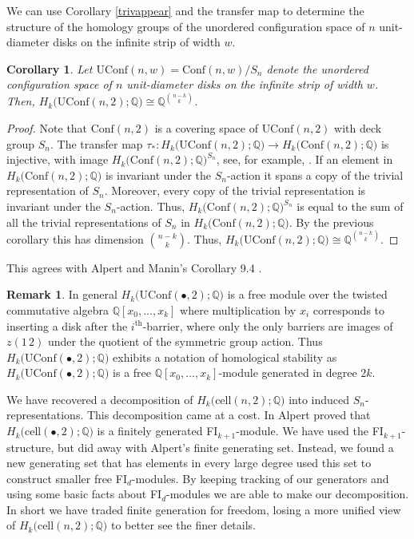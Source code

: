\documentclass[12py]{amsart}%
\newtheorem{cor}[thm]{Corollary}
\theoremstyle{definition}\newtheorem{definition}[thm]{Definition}
\theoremstyle{definition}
\newtheorem{remark}[thm]{Remark}
\newcommand{\Q}{\ensuremath{\mathbb{Q}}}
\begin{document}
We can use Corollary \ref{trivappear} and the transfer map to determine the structure of the homology groups of the unordered configuration space of $n$ unit-diameter disks on the infinite strip of width $w$.

\begin{cor}
Let $\text{UConf}(n,w)=\text{Conf}(n,w)/S_{n}$ denote the unordered configuration space of $n$ unit-diameter disks on the infinite strip of width $w$. Then, $H_{k}\big(\text{UConf}(n,2);\Q\big)\cong\Q^{\binom{n-k}{k}}$.
\end{cor}

\begin{proof}
Note that $\text{Conf}(n,2)$ is a covering space of $\text{UConf}(n,2)$ with deck group $S_{n}$. The transfer map $\tau_{*}:H_{k}\big(\text{UConf}(n,2);\Q\big)\to H_{k}\big(\text{Conf}(n,2);\Q\big)$ is injective, with image $H_{k}\big(\text{Conf}(n,2);\Q\big)^{S_{n}}$, see, for example, \cite[Proposition 3G.1]{hatcher2005algebraic}. If an element in $H_{k}\big(\text{Conf}(n,2);\Q\big)$ is invariant under the $S_{n}$-action it spans a copy of the trivial representation of ${S_{n}}$. Moreover, every copy of the trivial representation is invariant under the $S_{n}$-action. Thus, $H_{k}\big(\text{Conf}(n,2);\Q\big)^{S_{n}}$ is equal to the sum of all the trivial representations of $S_{n}$ in $H_{k}\big(\text{Conf}(n,2);\Q\big)$. By the previous corollary this has dimension $\binom{n-k}{k}$. Thus, $H_{k}\big(\text{UConf}(n,2);\Q\big)\cong\Q^{\binom{n-k}{k}}$.
\end{proof}

This agrees with Alpert and Manin's Corollary 9.4 \cite[Corollary 9.4]{alpert2021configuration1}. 

\begin{remark}
In general $H_{k}\big(\text{UConf}(\bullet, 2);\Q\big)$ is a free module over the twisted commutative algebra $\Q[x_{0}, \dots, x_{k}]$ where multiplication by $x_{i}$ corresponds to inserting a disk after the $i^{\text{th}}$-barrier, where only the only barriers are images of $z(1\,2)$ under the quotient of the symmetric group action. Thus $H_{k}\big(\text{UConf}(\bullet, 2);\Q\big)$ exhibits a notation of homological stability as $H_{k}\big(\text{UConf}(\bullet, 2);\Q\big)$ is a free $\Q[x_{0}, \dots, x_{k}]$-module generated in degree $2k$.
\end{remark}

We have recovered a decomposition of $H_{k}\big(\text{cell}(n,2);\Q\big)$ into induced $S_{n}$-representations. This decomposition came at a cost. In \cite{alpert2020generalized} Alpert proved that $H_{k}\big(\text{cell}(\bullet,2);\Q\big)$ is a finitely generated FI$_{k+1}$-module. We have used the FI$_{k+1}$-structure, but did away with Alpert's finite generating set. Instead, we found a new generating set that has elements in every large degree used this set to construct smaller free FI$_{d}$-modules. By keeping tracking of our generators and using some basic facts about FI$_{d}$-modules we are able to make our decomposition. In short we have traded finite generation for freedom, losing a more unified view of $H_{k}\big(\text{cell}(n,2);\Q\big)$ to better see the finer details.
\end{document}
